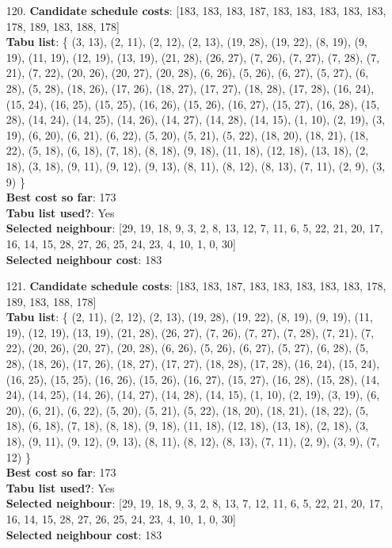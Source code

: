 \documentclass[fleqn]{article}
\begin{document}
\begin{itemize}
    \item[120.] \textbf{Candidate schedule costs}: [183, 183, 183, 187, 183, 183, 183, 183, 183, 178, 189, 183, 188, 178] \\
    \textbf{Tabu list}: \{ (3, 13), (2, 11), (2, 12), (2, 13), (19, 28), (19, 22), (8, 19), (9, 19), (11, 19), (12, 19), (13, 19), (21, 28), (26, 27), (7, 26), (7, 27), (7, 28), (7, 21), (7, 22), (20, 26), (20, 27), (20, 28), (6, 26), (5, 26), (6, 27), (5, 27), (6, 28), (5, 28), (18, 26), (17, 26), (18, 27), (17, 27), (18, 28), (17, 28), (16, 24), (15, 24), (16, 25), (15, 25), (16, 26), (15, 26), (16, 27), (15, 27), (16, 28), (15, 28), (14, 24), (14, 25), (14, 26), (14, 27), (14, 28), (14, 15), (1, 10), (2, 19), (3, 19), (6, 20), (6, 21), (6, 22), (5, 20), (5, 21), (5, 22), (18, 20), (18, 21), (18, 22), (5, 18), (6, 18), (7, 18), (8, 18), (9, 18), (11, 18), (12, 18), (13, 18), (2, 18), (3, 18), (9, 11), (9, 12), (9, 13), (8, 11), (8, 12), (8, 13), (7, 11), (2, 9), (3, 9) \} \\
    \textbf{Best cost so far}: 173 \\
    \textbf{Tabu list used?}: Yes \\
    \textbf{Selected neighbour}: [29, 19, 18, 9, 3, 2, 8, 13, 12, 7, 11, 6, 5, 22, 21, 20, 17, 16, 14, 15, 28, 27, 26, 25, 24, 23, 4, 10, 1, 0, 30] \\
    \textbf{Selected neighbour cost}: 183
      

    \item[121.] \textbf{Candidate schedule costs}: [183, 183, 187, 183, 183, 183, 183, 183, 178, 189, 183, 188, 178] \\
    \textbf{Tabu list}: \{ (2, 11), (2, 12), (2, 13), (19, 28), (19, 22), (8, 19), (9, 19), (11, 19), (12, 19), (13, 19), (21, 28), (26, 27), (7, 26), (7, 27), (7, 28), (7, 21), (7, 22), (20, 26), (20, 27), (20, 28), (6, 26), (5, 26), (6, 27), (5, 27), (6, 28), (5, 28), (18, 26), (17, 26), (18, 27), (17, 27), (18, 28), (17, 28), (16, 24), (15, 24), (16, 25), (15, 25), (16, 26), (15, 26), (16, 27), (15, 27), (16, 28), (15, 28), (14, 24), (14, 25), (14, 26), (14, 27), (14, 28), (14, 15), (1, 10), (2, 19), (3, 19), (6, 20), (6, 21), (6, 22), (5, 20), (5, 21), (5, 22), (18, 20), (18, 21), (18, 22), (5, 18), (6, 18), (7, 18), (8, 18), (9, 18), (11, 18), (12, 18), (13, 18), (2, 18), (3, 18), (9, 11), (9, 12), (9, 13), (8, 11), (8, 12), (8, 13), (7, 11), (2, 9), (3, 9), (7, 12) \} \\
    \textbf{Best cost so far}: 173 \\
    \textbf{Tabu list used?}: Yes \\
    \textbf{Selected neighbour}: [29, 19, 18, 9, 3, 2, 8, 13, 7, 12, 11, 6, 5, 22, 21, 20, 17, 16, 14, 15, 28, 27, 26, 25, 24, 23, 4, 10, 1, 0, 30] \\
    \textbf{Selected neighbour cost}: 183
      


\end{itemize}
\end{document}
